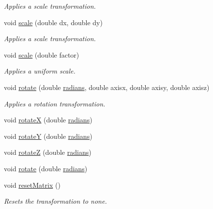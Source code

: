 \begin{DoxyCompactItemize}
\begin{DoxyCompactList}\small\item\em \-Applies a scale transformation. \end{DoxyCompactList}\item 
void \hyperlink{namespacecprocessing_a9f393203e195c6843c3880c952432ec7}{scale} (double dx, double dy)
\begin{DoxyCompactList}\small\item\em \-Applies a scale transformation. \end{DoxyCompactList}\item 
void \hyperlink{namespacecprocessing_a987be2f2fbe7386914a94dac7343801e}{scale} (double factor)
\begin{DoxyCompactList}\small\item\em \-Applies a uniform scale. \end{DoxyCompactList}\item 
void \hyperlink{namespacecprocessing_afa46f333138777dcaa09eeff125a9d39}{rotate} (double \hyperlink{namespacecprocessing_a8e4f15390e12437ed626441da1cc767d}{radians}, double axisx, double axisy, double axisz)
\begin{DoxyCompactList}\small\item\em \-Applies a rotation transformation. \end{DoxyCompactList}\item 
void \hyperlink{namespacecprocessing_af0ade51f94b423933c31eafd92b96ab8}{rotate\-X} (double \hyperlink{namespacecprocessing_a8e4f15390e12437ed626441da1cc767d}{radians})
\item 
void \hyperlink{namespacecprocessing_ab42ccf131e68079e8333e209b5bbd70e}{rotate\-Y} (double \hyperlink{namespacecprocessing_a8e4f15390e12437ed626441da1cc767d}{radians})
\item 
void \hyperlink{namespacecprocessing_adb7051057100be20b837209c6a479fc6}{rotate\-Z} (double \hyperlink{namespacecprocessing_a8e4f15390e12437ed626441da1cc767d}{radians})
\item 
void \hyperlink{namespacecprocessing_a14fb0bc1e493f50d941da1f95cfaf227}{rotate} (double \hyperlink{namespacecprocessing_a8e4f15390e12437ed626441da1cc767d}{radians})
\item 
void \hyperlink{namespacecprocessing_af2d05683bc26cdc849748dbcc4fd9633}{reset\-Matrix} ()
\begin{DoxyCompactList}\small\item\em \-Resets the transformation to none. \end{DoxyCompactList}\item 

\end{DoxyCompactItemize}
